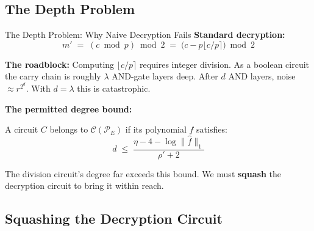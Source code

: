 \documentclass[10pt]{beamer}
\begin{document}
\subsection{The Depth Problem}

\begin{frame}{The Depth Problem: Why Naive Decryption Fails}
    \textbf{Standard decryption:}
    \[
        m' \;=\; (c \bmod p) \bmod 2
        \;=\; \bigl(c - p\lfloor c/p \rceil\bigr) \bmod 2
    \]
    \pause

    \vspace{0.2cm}
    \textbf{The roadblock:} Computing $\lfloor c/p \rceil$ requires integer
    division. As a boolean circuit the carry chain is roughly $\lambda$
    AND-gate layers deep. After $d$ AND layers, noise $\approx r^{2^d}$.
    With $d = \lambda$ this is catastrophic.
    \pause

    \vspace{0.2cm}
    \textbf{The permitted degree bound:}

    A circuit $C$ belongs to $\mathcal{C}(\mathcal{P}_E)$ if its
    polynomial $f$ satisfies:
    \[
        d \;\leq\; \frac{\eta - 4 - \log \|\hat{f}\|_1}{\rho' + 2}
    \]

    \vspace{0.1cm}
    The division circuit's degree far exceeds this bound.
    We must \textbf{squash} the decryption circuit to bring it within reach.
\end{frame}

\subsection{Squashing the Decryption Circuit}
\end{document}
